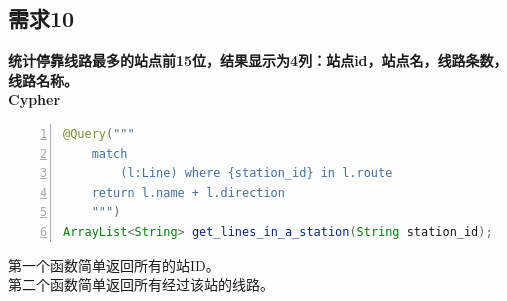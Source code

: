 \documentclass[11pt,a4paper]{article}
\begin{document}
\subsection{需求10}
\textbf{统计停靠线路最多的站点前15位，结果显示为4列：站点id，站点名，线路条数，线路名称。} \\
\textbf{Cypher} \\
\begin{lstlisting}[numbers = left, 
showstringspaces=false,
showspaces = false,
breaklines = true, 
language=Java]
@Query("""
	match
		(l:Line) where {station_id} in l.route
	return l.name + l.direction
	""")
ArrayList<String> get_lines_in_a_station(String station_id);
\end{lstlisting} 
第一个函数简单返回所有的站ID。 \\
第二个函数简单返回所有经过该站的线路。
\end{document}

